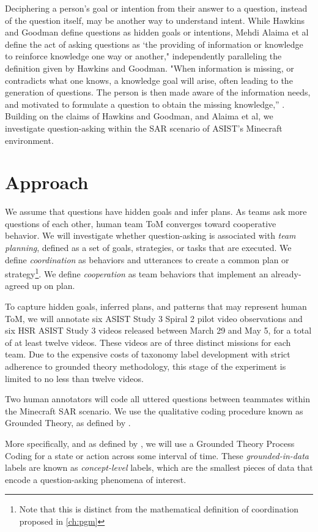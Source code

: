Deciphering a person’s goal or intention from their answer to a question,
instead of the question itself, may be another way to understand intent. While
Hawkins and Goodman define questions as hidden goals or intentions, Mehdi
Alaima et al define the act of asking questions as ‘the providing of
information or knowledge to reinforce knowledge one way or another,"
independently paralleling the definition given by Hawkins and Goodman. "When
information is missing, or contradicts what one knows, a knowledge goal will
arise, often leading to the generation of questions. The person is then made
aware of the information needs, and motivated to formulate a question to obtain
the missing knowledge,” \citep{alaimi_2020}. Building on the claims of Hawkins
and Goodman, and Alaima et al, we investigate question-asking within the SAR
scenario of ASIST’s Minecraft environment. 


\section{Approach}

We assume that questions have hidden goals and infer plans. As teams ask more
questions of each other, human team ToM converges toward cooperative behavior.
We will investigate whether question-asking is associated with \emph{team
planning}, defined as a set of goals, strategies, or tasks that are executed.
We define \emph{coordination} as behaviors and utterances to create a common
plan or strategy\footnote{Note that this is distinct from the mathematical
definition of coordination proposed in \autoref{ch:pgm}}. We define
\emph{cooperation} as team behaviors that implement an already-agreed up on
plan.

To capture hidden goals, inferred plans, and patterns that may represent human
ToM, we will annotate six ASIST Study 3 Spiral 2 pilot video observations and
six HSR ASIST Study 3 videos released between March 29 and May 5, for a total
of at least twelve videos. These videos are of three distinct missions for each
team. Due to the expensive costs of taxonomy label development with strict
adherence to grounded theory methodology, this stage of the experiment is
limited to no less than twelve videos. 

Two human annotators will code all uttered questions between teammates within
the Minecraft SAR scenario.  We use the qualitative coding procedure known as
Grounded Theory, as defined by \citet{corbin_strauss_2015}. 

More specifically, and as defined by \citet{saldana_2021}, we will use a
Grounded Theory Process Coding for a state or action across some interval of
time. These \emph{grounded-in-data} labels are known as \emph{concept-level}
labels, which are the smallest pieces of data that encode a question-asking
phenomena of interest.

